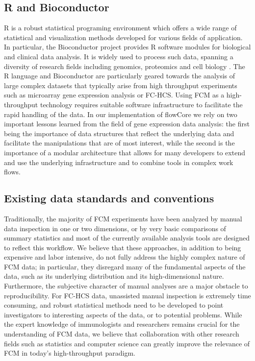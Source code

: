 \documentclass[12pt]{article}
\newcommand{\Rpackage}[1]{{\textsf{#1}}}
\begin{document}
\subsection*{R and Bioconductor}
R is a robust statistical programing environment which offers a wide
range of statistical and visualization methods developed for various
fields of application. In particular, the Bioconductor project
provides R software modules for biological and clinical data analysis.
It is widely used to process such data, spanning a diversity of
research fields including genomics, proteomics and cell biology
\citep{BIOC}. The R language and Bioconductor are
particularly geared towards the analysis of large complex datasets
that typically arise from high throughput experiments such as
microarray gene expression analysis or FC-HCS. Using FCM as
a high-throughput technology requires suitable software infrastructure
to facilitate the rapid handling of the data. In our implementation of
\Rpackage{flowCore} we rely on two important lessons learned from the field of
gene expression data analysis: the first being the importance of data
structures that reflect the underlying data and facilitate the
manipulations that are of most interest, while the second is the
importance of a modular architecture that allows for many developers
to extend and use the underlying infrastructure and to combine tools
in complex work flows.

\subsection*{Existing data standards and conventions}
Traditionally, the majority of FCM experiments have been analyzed by
manual data inspection in one or two dimensions, or by very basic
comparisons of summary statistics and most of the currently available
analysis tools are designed to reflect this workflow.  We believe that
these approaches, in addition to being expensive and labor intensive,
do not fully address the highly complex nature of FCM data; in
particular, they disregard many of the fundamental aspects of the
data, such as its underlying distribution and its high-dimensional
nature. Furthermore, the subjective character of manual analyses are a
major obstacle to reproducibility. For FC-HCS data, unassisted manual
inspection is extremely time consuming, and robust statistical methods
need to be developed to point investigators to interesting aspects of
the data, or to potential problems. While the expert knowledge of
immunologists and researchers remains crucial for the understanding of
FCM data, we believe that collaboration with other research fields
such as statistics and computer science can greatly improve the
relevance of FCM in today's high-throughput paradigm.
\end{document}
